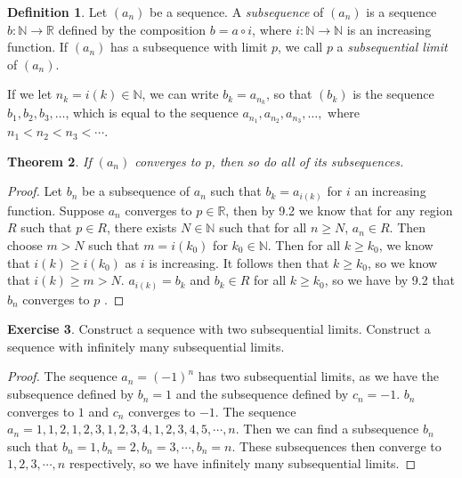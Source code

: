 \documentclass[12pt]{article}
\newcommand{\bbN}{\mathbb{N}}
\newcommand{\bbR}{\mathbb{R}}
\renewcommand{\_}[1]{\underline{ #1 }}
\newtheorem{theorem}{Theorem}[section]
\theoremstyle{definition}
\newtheorem{definition}[theorem]{Definition}
\newtheorem{exercise}[theorem]{Exercise}
\numberwithin{equation}{subsection}
\begin{document}
\begin{definition}  Let $(a_n)$ be a sequence.  A \emph{subsequence} of $(a_n)$ is a sequence 
$b\colon \bbN \rightarrow \bbR$ defined by the composition $b = a \circ i$, where 
$i \colon \bbN \rightarrow \bbN$ is an increasing function.  
If $(a_n)$ has a subsequence with limit $p$, we call $p$ a \emph{subsequential limit} of $(a_n)$.
\end{definition}

\noindent  If we let $n_k = i(k) \in \bbN$, we can write $b_k = a_{n_k}$, so that $(b_k)$ is the 
sequence $b_1, b_2, b_3, \dotsc$, which is equal to the sequence
$a_{n_1}, a_{n_2}, a_{n_3}, \dotsc, $ where $n_1 < n_2 < n_3 < \dotsm$.

\begin{theorem}  If $(a_n)$ converges to $p$, then so do all of its subsequences.
\end{theorem}

\begin{proof}
Let $b_n$ be a subsequence of $a_n$ such that $b_k = a_{i(k)}$ for $i$ an increasing function. Suppose $a_n$ converges to $p \in \bbR$, then by 9.2 we know that for any region $R$ such that $p \in R$, there exists $N \in \bbN$ such that for all $n \geq N$, $a_n \in R$. Then choose $m > N$ such that $m = i(k_0)$ for $k_0 \in \bbN$. Then for all $k \geq k_0$, we know that $i(k) \geq i(k_0)$ as $i$ is increasing. It follows then that $k \geq k_0$, so we know that $i(k) \geq m > N$. $a_{i(k)} = b_k$ and $b_k \in R$ for all $k \geq k_0$, so we have by 9.2 that $b_n$ converges to $p$ .
\end{proof}

\begin{exercise}  Construct a sequence with two subsequential limits.  Construct a sequence with infinitely many subsequential limits.
\end{exercise}

\begin{proof}
The sequence $a_n = (-1)^n$ has two subsequential limits, as we have the subsequence defined by $b_n = 1$ and the subsequence defined by $c_n = -1$. $b_n$ converges to $1$ and $c_n$ converges to $-1$. \newline
The sequence $a_n = 1,1,2,1,2,3,1,2,3,4,1,2,3,4,5, \dotsm, n$. Then we can find a subsequence $b_n$ such that $b_n = 1, b_n = 2, b_n = 3, \dotsm, b_n = n$. These subsequences then converge to $1,2,3,\dotsm,n$ respectively, so we have infinitely many subsequential limits.
\end{proof}
\end{document}
